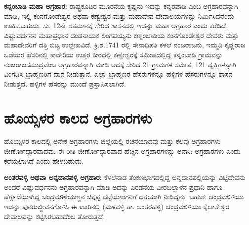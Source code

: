 \textbf{ಕನ್ನಂಬಾಡಿ ಮಹಾ ಅಗ್ರಹಾರ:} ರಾಷ್ಟ್ರಕೂಟರ ಮೂರನೆಯ ಕೃಷ್ಣನು ಇದನ್ನು ಕನ್ನರಪಾಡಿ ಎಂಬ ಅಗ್ರಹಾರವನ್ನಾಗಿ ಮಾಡಿ, ಇಲ್ಲಿ ಕಂನಗೊಂಡೇಶ್ವರ ಅಥವಾ ಕಣ್ವೇಶ್ವರ ಮತ್ತು ಮಹಾದೇವ ದೇವಾಲಯಗಳನ್ನು ನಿರ್ಮಿಸಿದನೆಂದು ಊಹಿಸಬಹುದು. ಸು. 12ನೇ ಶತಮಾನಕ್ಕೆ ಸೇರಿದ ಶಾಸನದಲ್ಲಿ ಇದನ್ನು ಮಹಾ ಅಗ್ರಹಾರ ಎಂದು ಕರೆದಿದೆ. ವಿಷ್ಣುವರ್ಧನನ ಮಹಾಪ್ರಧಾನ ದಂಡನಾಯಕ ಲಿಂಗಪಯ್ಯನು ಕಣ್ನಂಬಾಡಿಯ ಕಂನಗೊಂಡೇಶ್ವರ ದೇವರು ಮತ್ತು ಮಹಾದೇವರಿಗೆ ದತ್ತಿ ಬಿಟ್ಟ ಉಲ್ಲೇಖವಿದೆ. ಕ್ರಿ.ಶ.1741 ರಲ್ಲಿ ಸೇನಾಧಿಪತಿ ಕಳಲೆ ನಂಜರಾಜನು, ಇಮ್ಮಡಿ ಕೃಷ್ಣರಾಜ ಒಡೆಯರ ಹೆಸರಿನಲ್ಲಿ ಕಾವೇರಿಯ ಉತ್ತರ ತೀರದಲ್ಲಿ ಕಣ್ವೇಶ್ವರಕ್ಕೆ ಸಮೀಪದಲ್ಲಿದ್ದ ಕನ್ನಂಬಾಡಿ ಗ್ರಾಮವನ್ನು ನಂಜರಾಜಸಮುದ್ರವೆಂಬ ಅಗ್ರಹಾರವನ್ನಾಗಿ ಮಾಡಿ ಅದಕ್ಕೆ ಸೇರಿದ 21 ಗ್ರಾಮಗಳ ಸಮೇತ, 121 ವೃತ್ತಿಗಳನ್ನಾಗಿ ವಿಂಗಡಿಸಿ ಬ್ರಾಹ್ಮಣರಿಗೆ ದಾನ ನೀಡುತ್ತಾನೆ. ಎಲ್ಲಾ ಬ್ರಾಹ್ಮಣರ ಹೆಸರುಗಳನ್ನೂ ಹಳ್ಳಿಗಳ ಹೆಸರುಗಳನ್ನೂ ಶಾಸನ ನೀಡುತ್ತದೆ. ಹಳ್ಳಿಗಳ ಹೆಸರನ್ನು ಮುಂದೆ ಪ್ರಸ್ತಾಪಿಸಲಾಗಿದೆ.


\section*{ಹೊಯ್ಸಳರ ಕಾಲದ ಅಗ್ರಹಾರಗಳು}

ಹೊಯ್ಸಳರ ಕಾಲದಲ್ಲಿ ಅನೇಕ ಅಗ್ರಹಾರಗಳು ಜಿಲ್ಲೆಯಲ್ಲಿ ರಚನೆಯಾದವು ಮತ್ತು ಕೆಲವು ಅಗ್ರಹಾರಗಳು ಜೀರ್ಣೋದ್ಧಾರ\-ವಾದವು. ಈ ರೀತಿ ಜೀರ್ಣೋದ್ಧಾರವಾದ ಹೆಚ್ಚಿನ ಅಗ್ರಹಾರಗಳನ್ನು ಅನಾದಿ ಅಗ್ರಹಾರಗಳು ಎಂದು ಕರೆಯಲಾಗಿದೆ ಎಂದು ಹೇಳಬಹುದು.

\textbf{ಅಂತರವಳ್ಳಿ ಅಥವಾ ಅನ್ನದಾನಪಳ್ಳಿ ಅಗ್ರಹಾರ:} ಕೆಳಲೆನಾಡ ತೆಂಕಣಭಾಗದಲ್ಲಿದ್ದ ಅನ್ನದಾನಪಲ್ಲಿಯನ್ನು ವಿಟ್ಟಿದೇವನು ಅಂದರೆ ವಿಷ್ಣುವರ್ಧನನು ಅಗ್ರಹಾರವನ್ನಾಗಿ ಮಾಡಿ ಅದನ್ನು ಎರಡನೆಯ ವೀರಬಲ್ಲಾಳನ ಪ್ರಧಾನಿ ಹಾಗೂ ಪೆರ್ಗ್ಗಡೆಯಾಗಿದ್ದ ಚಂದ್ರಮೌಳಿಯಣ್ಣನ ಚಿಕ್ಕಪ್ಪ ಪಟ್ಟೆಯಾಂಗನಿಗೆ ದತ್ತಯಾಗಿ ನೀಡಿದ್ದನು. ಬಹುಶಃ ಚಂದ್ರಮೌಳಿಯು ಇದನ್ನು ಪುನರುಜ್ಜೀವನಗೊಳಿಸಿ ಈ ಊರಿನಲ್ಲಿ (ಮಳವಳ್ಳಿ ತಾ. ಅಂತರಹಳ್ಳಿ) ಚಂದ್ರಮೌಳಿಯು ಕೈಲಾಸೇಶ್ವರ ದೇವಾಲವನ್ನು ಕಟ್ಟಿಸಿರಬಹುದೆಂಬ ತೋರುತ್ತದೆ.

